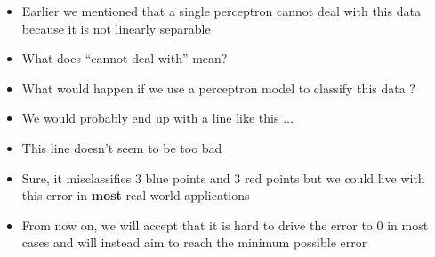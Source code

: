\documentclass[aspectratio=169]{beamer}
\begin{document}
\begin{frame}
\begin{columns}
\begin{overlayarea}{\textwidth}{\textheight}

\end{overlayarea}

\begin{overlayarea}{\textwidth}{\textheight}
\begin{itemize}
\item<1-> Earlier we mentioned that a single perceptron cannot deal with this data because it is not linearly separable
\item<2-> What does ``cannot deal with'' mean?
\item<3-> What would happen if we use a perceptron model to classify this data ?
\item<4-> We would probably end up with a line like this ...
\item<5-> This line doesn't seem to be too bad 
\item<6-> Sure, it misclassifies 3 blue points and 3 red points but we could live with this error in \textbf{most} real world applications
\item<7-> From now on, we will accept that it is hard to drive the error to 0 in most cases and will instead aim to reach the minimum possible error
\end{itemize}
\end{overlayarea}
\end{columns}
\end{frame}
\end{document}
